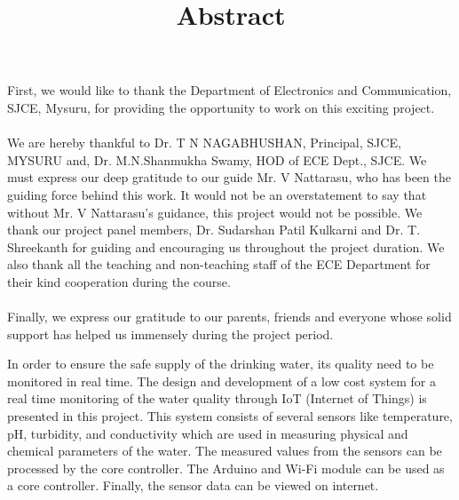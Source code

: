 \documentclass[12pt]{extarticle}
\numberwithin{figure}{section}
\begin{document}
\paragraph{}
First, we would like to thank the Department of Electronics and Communication, SJCE, Mysuru, for providing the opportunity to work on this exciting project.
\paragraph{}
We are hereby thankful to Dr. T N NAGABHUSHAN, Principal, SJCE, MYSURU and, 
 Dr. M.N.Shanmukha Swamy, HOD of ECE Dept., SJCE. We must express our deep gratitude to our guide Mr. V Nattarasu, who has been the guiding force behind this work. It would not be an overstatement to say that without Mr. V Nattarasu’s guidance, this project would not be possible. We thank our project panel members, Dr. Sudarshan Patil Kulkarni and
Dr. T. Shreekanth for guiding and encouraging us throughout the project duration. We also thank all the teaching and non-teaching staff of the ECE Department for their kind cooperation during the course.
\paragraph{}
Finally, we express our gratitude to our parents, friends and everyone whose solid support has helped us immensely during the project period.

\newpage
\thispagestyle{empty}
\begin{center}
\title{Abstract}
\date{\vspace{-5ex}}
\maketitle
\end{center}
In order to ensure the safe supply of the drinking water, its quality need to be monitored in real time. The design and development of a low cost system for a real time monitoring of the water quality through IoT (Internet of Things) is presented in this project. This system consists of several sensors like temperature, pH, turbidity, and conductivity which are used in measuring physical and chemical parameters of the water. The measured values from the sensors can be processed by the core controller. The Arduino and Wi-Fi module can be used as a core controller. Finally, the sensor data can be viewed on internet.
\newpage
\tableofcontents
\thispagestyle{empty}

\newpage
\listoffigures
\thispagestyle{empty}
\setcounter{page}{0}
\end{document}
